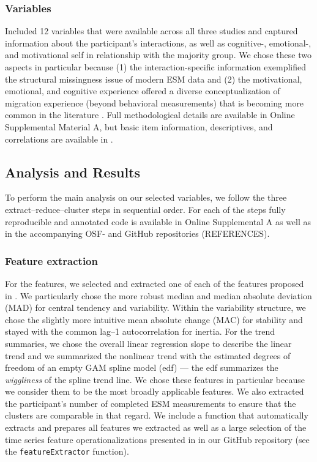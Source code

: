 \subsubsection{Variables}

Included 12 variables that were available across all three studies and
captured information about the participant's interactions, as well as
cognitive-, emotional-, and motivational self in relationship with the
majority group. We chose these two aspects in particular because (1) the
interaction-specific information exemplified the structural missingness
issue of modern ESM data and (2) the motivational, emotional, and
cognitive experience offered a diverse conceptualization of migration
experience (beyond behavioral measurements) that is becoming more common
in the literature \citep[][]{Kreienkamp2022d}. Full methodological
details are available in Online Supplemental Material A, but basic item
information, descriptives, and correlations are available in
.

\subsection{Analysis and Results}

To perform the main analysis on our selected variables, we follow the
three extract--reduce--cluster steps in sequential order. For each of
the steps fully reproducible and annotated code is available in Online
Supplemental A as well as in the accompanying OSF- and GitHub
repositories (REFERENCES).

\subsubsection{Feature extraction}

For the features, we selected and extracted one of each of the features
proposed in . We particularly chose the more
robust median and median absolute deviation (MAD) for central tendency
and variability. Within the variability structure, we chose the slightly
more intuitive mean absolute change (MAC) for stability and stayed with
the common lag--1 autocorrelation for inertia. For the trend summaries,
we chose the overall linear regression slope to describe the linear
trend and we summarized the nonlinear trend with the estimated degrees
of freedom of an empty GAM spline model (edf) --- the edf summarizes the
\textit{wiggliness} of the spline trend line. We chose these features in
particular because we consider them to be the most broadly applicable
features. We also extracted the participant's number of completed ESM
measurements to ensure that the clusters are comparable in that regard.
We include a function that automatically extracts and prepares all
features we extracted as well as a large selection of the time series
feature operationalizations presented in  in our
GitHub repository (see the \texttt{featureExtractor} function).

